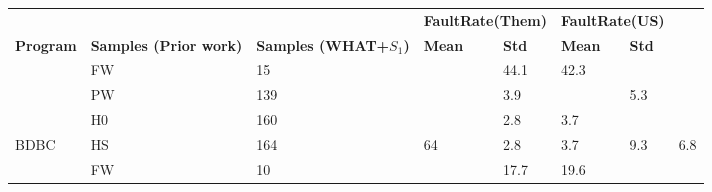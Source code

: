 \begin{figure*}[!t]
\centering
\begin{tabular}{|l|l||l|l|ll|l|l|}
\hline
                                   &                                              &                                            & \multicolumn{2}{l|}{\textbf{FaultRate(Them)}}                                    & \multicolumn{2}{l|}{\textbf{FaultRate(US)}}   \\ \cline{4-7} 
\multirow{-2}{*}{\textbf{Program}} & \multirow{-2}{*}{\textbf{Samples (Prior work)}} & \multirow{-2}{*}{\textbf{Samples (WHAT+$S_1$)}} & \multicolumn{1}{l|}{\textbf{Mean}}                & \textbf{Std}                 & \textbf{Mean}         & \textbf{Std}          \\ \hline
                                 &FW  & 15                                           &                                            & \multicolumn{1}{l|}{\cellcolor[HTML]{C0C0C0}44.1} & \cellcolor[HTML]{C0C0C0}42.3 &                       &                       \\ \cline{2-2} \cline{4-5}
                                &PW   & 139                                          &                                            & \multicolumn{1}{l|}{3.9}                  &        & 5.3                          &                       &                       \\ \cline{2-2} \cline{4-5}
                                 &H0  &  160                                          &                                            & \multicolumn{1}{l|}{2.8}                          & 3.7                          &                       &                       \\ \cline{2-2} \cline{4-5}
\multirow{-4}{*}{BDBC}         &HS    & 164                                          & \multirow{-4}{*}{64}                       & \multicolumn{1}{l|}{2.8}                          & 3.7                          & \multirow{-4}{*}{9.3} & \multirow{-4}{*}{6.8} \\ \hline
                        &FW           & 10                                           &                                            & \multicolumn{1}{l|}{\cellcolor[HTML]{C0C0C0}17.7} & \cellcolor[HTML]{C0C0C0}19.6 &                       &                       \\ \cline{2-2} \cline{4-5}

\end{tabular}
\end{figure*}
